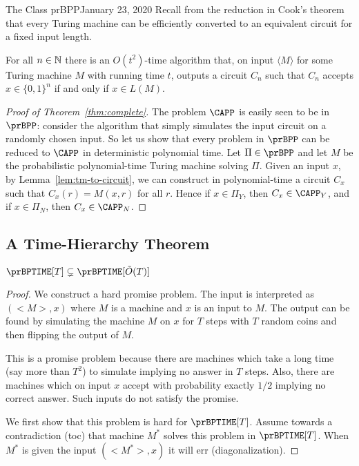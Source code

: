 \begin{lecture}{1}{The Class prBPP}{January 23, 2020}
Recall from the reduction in Cook's theorem that every Turing machine can be
efficiently converted to an equivalent circuit for a fixed input length.
\begin{lemma}\label{lem:tm-to-circuit}
  For all $n \in \mathbb{N}$ there is an $O(t^2)$-time algorithm that, on input
  $\langle M \rangle$ for some Turing machine $M$ with running time $t$, outputs a circuit $C_n$ such
  that $C_n$ accepts $x \in \{0, 1\}^n$ if and only if $x \in L(M)$.
\end{lemma}

\begin{proof}[Proof of Theorem~\ref{thm:complete}]
  The problem $\CAPP$ is easily seen to be in $\prBPP$: consider the algorithm
  that simply simulates the input circuit on a randomly chosen input. So let us
  show that every problem in $\prBPP$ can be reduced to $\CAPP$ in
  deterministic polynomial time. Let $\Pi \in \prBPP$ and let $M$ be the
  probabilistic polynomial-time Turing machine solving $\Pi$. Given an input
  $x$, by Lemma~\ref{lem:tm-to-circuit}, we can construct in polynomial-time a
  circuit $C_x$ such that $C_x(r) = M(x, r)$ for all $r$. Hence if $x \in
  \Pi_Y$, then $C_x \in \CAPP_Y$, and if $x \in \Pi_N$, then $C_x \in \CAPP_N$.
\end{proof}

\subsection{A Time-Hierarchy Theorem}

\begin{theorem}
  $\prBPTIME[T] \subsetneq \prBPTIME[\tilde{O}(T)]$
\end{theorem}
\begin{proof}
	We construct a hard promise problem. The input is interpreted as $(<M>,x)$ where $M$ is a machine and $x$ is an input to $M$. The output can be found by simulating the machine $M$ on $x$ for $T$ steps with $T$ random coins and then flipping the output of $M$. 
	
	This is a promise problem because there are machines which take a long time (say more than $T^2$) to simulate implying no answer in $T$ steps. Also, there are machines which on input $x$ accept with probability exactly $1/2$ implying no correct answer. Such inputs do not satisfy the promise.
	
	We first show that this problem is hard for $\prBPTIME[T]$. Assume towards a contradiction (toc) that machine $M^*$ solves this problem in $\prBPTIME[T]$. When $M^*$ is given the input $(<M^*>,x)$ it will err (diagonalization). 
	

\end{proof}
\end{lecture}
